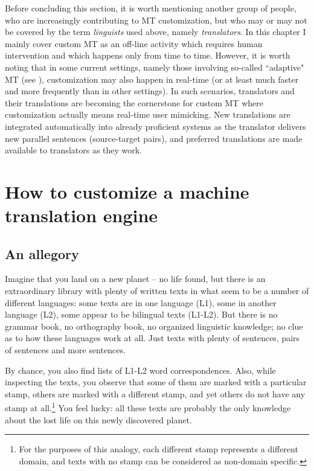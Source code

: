 \documentclass[output=paper]{langscibook}
\begin{document}
Before concluding this section, it is worth mentioning another group of people, who are increasingly contributing to MT customization, but who may or may not be covered by the term \textit{linguists} used above, namely \textit{translators}. In this chapter I mainly cover custom MT as an off-line activity which requires human intervention and which happens only from time to time. However, it is worth noting that in some current settings, namely those involving so-called “adaptive" MT (see ), customization may also happen in real-time (or at least much faster and more frequently than in other settings). In such scenarios,  translators and their translations are becoming the cornerstone for custom MT where customization actually means real-time user mimicking. New translations are integrated automatically into already proficient systems as the translator delivers new parallel sentences (source-target pairs), and preferred translations are made available to translators as they work.

\section{How to customize a machine translation engine}

\subsection{An allegory}
Imagine that you land on a new planet -- no life found, but there is an extraordinary library with plenty of written texts in what seem to be a number of different languages: some texts are in one language (L1), some in another language (L2), some appear to be bilingual texts (L1-L2). But there is no grammar book, no orthography book, no organized linguistic knowledge; no clue as to how these languages work at all. Just texts with plenty of sentences, pairs of sentences and more sentences.

By chance, you also find lists of L1-L2 word correspondences. Also, while inspecting the texts, you observe that some of them are marked with a particular stamp, others are marked with a different stamp, and yet others do not have any stamp at all.\footnote{For the purposes of this analogy, each different stamp represents a different domain, and texts with no stamp can be considered as non-domain specific.} You feel lucky: all these texts are probably the only knowledge about the lost life on this newly discovered planet.
\end{document}
